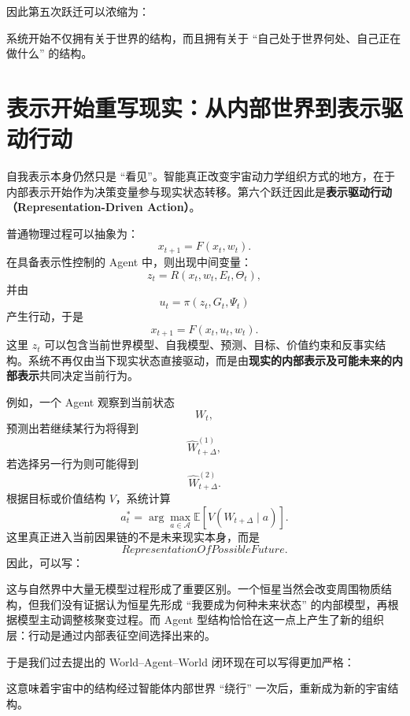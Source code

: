因此第五次跃迁可以浓缩为：
\begin{statementbox}
\centering
{}
\end{statementbox}
系统开始不仅拥有关于世界的结构，而且拥有关于 ``自己处于世界何处、自己正在做什么'' 的结构。

\section{表示开始重写现实：从内部世界到表示驱动行动}

自我表示本身仍然只是 ``看见''。智能真正改变宇宙动力学组织方式的地方，在于内部表示开始作为决策变量参与现实状态转移。第六个跃迁因此是\textbf{表示驱动行动（Representation-Driven Action）}。

普通物理过程可以抽象为：
\[
x_{t+1}
=
F(x_t,w_t).
\]
在具备表示性控制的 Agent 中，则出现中间变量：
\[
z_t
=
R(x_t,w_t,E_t,\Theta_t),
\]
并由
\[
u_t
=
\pi(z_t,G_t,\Psi_t)
\]
产生行动，于是
\[
x_{t+1}
=
F(x_t,u_t,w_t).
\]
这里 $z_t$ 可以包含当前世界模型、自我模型、预测、目标、价值约束和反事实结构。系统不再仅由当下现实状态直接驱动，而是由\textbf{现实的内部表示及可能未来的内部表示}共同决定当前行为。

例如，一个 Agent 观察到当前状态
\[
W_t,
\]
预测出若继续某行为将得到
\[
\hat W_{t+\Delta}^{(1)},
\]
若选择另一行为则可能得到
\[
\hat W_{t+\Delta}^{(2)}.
\]
根据目标或价值结构 $V$，系统计算
\[
a_t^\ast
=
\arg\max_{a\in\mathcal A}
\mathbb E
\left[
V(\hat W_{t+\Delta}\mid a)
\right].
\]
这里真正进入当前因果链的不是未来现实本身，而是
\[
RepresentationOfPossibleFuture.
\]
因此，可以写：
\begin{statementbox}
\centering
{}
\end{statementbox}

这与自然界中大量无模型过程形成了重要区别。一个恒星当然会改变周围物质结构，但我们没有证据认为恒星先形成 ``我要成为何种未来状态'' 的内部模型，再根据模型主动调整核聚变过程。而 Agent 型结构恰恰在这一点上产生了新的组织层：行动是通过内部表征空间选择出来的。

于是我们过去提出的 World--Agent--World 闭环现在可以写得更加严格：
\begin{statementbox}
\centering
{}
\end{statementbox}
这意味着宇宙中的结构经过智能体内部世界 ``绕行'' 一次后，重新成为新的宇宙结构。

